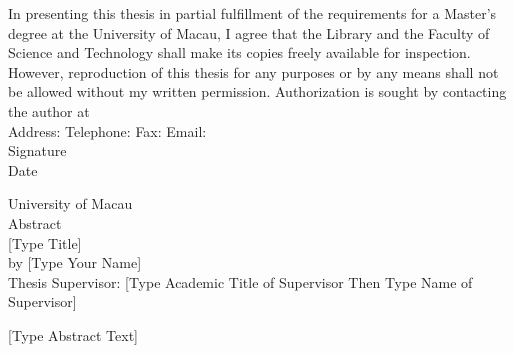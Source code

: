 \begin{titlepage}
\newpage
\thispagestyle{umempty}
\vspace*{4\baselineskip}
{ In presenting this thesis in partial fulfillment of the requirements for a Master's degree at the University of Macau, I agree that the Library and the Faculty of Science and Technology shall make its copies freely available for inspection. However, reproduction of this thesis for any purposes or by any means shall not be allowed without my written permission.
Authorization is sought by contacting the author at}\\[2\baselineskip]
{\mbox{\qquad} Address:}
{\mbox{\qquad} Telephone:}
{\mbox{\qquad} Fax:}
{\mbox{\qquad} Email:} \\[\baselineskip]
{\mbox{\qquad\qquad\qquad\qquad\qquad\qquad\qquad\qquad\qquad\qquad\qquad\qquad} Signature} \\[1\baselineskip]
{\mbox{\qquad\qquad\qquad\qquad\qquad\qquad\qquad\qquad\qquad\qquad\qquad\qquad} Date}

\newpage
\thispagestyle{umempty}
\begin{center}
\vspace*{5\baselineskip}
\textit{}
\end{center}

\newpage
\thispagestyle{umempty}
\vspace*{1\baselineskip}
\begin{center}
{\large University of Macau \\ [1\baselineskip]
Abstract} \\ [2\baselineskip]
[Type Title] \\ [1\baselineskip]
by [Type Your Name] \\ [1\baselineskip]
Thesis Supervisor: [Type Academic Title of Supervisor Then Type Name of Supervisor]
\end{center}
[Type Abstract Text]

\afterpage{\thispagestyle{umempty}\null\newpage}
\end{titlepage}
